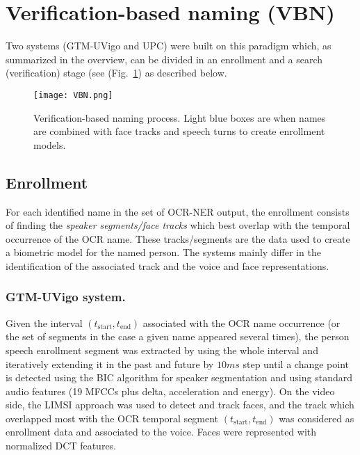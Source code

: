 \section{Verification-based naming (VBN)}
\label{sec:verification}

Two systems (GTM-UVigo and UPC) were built on this paradigm which, 
as summarized in the overview, can be divided in an enrollment and a 
search (verification) stage (see (Fig.~\ref{fig:vbn}) 
as described below.

\begin{figure}[tb]
 \centering
 \texttt{[image: VBN.png]}
\vspace*{-7mm}
 \caption{Verification-based naming process. Light blue boxes are when names are combined with face tracks and speech turns to create enrollment models.}
\vspace*{-3mm}
 \label{fig:vbn}
\end{figure}

\subsection{Enrollment}


For each identified name in the set of OCR-NER output, the enrollment consists of finding the  \textit{speaker segments/face tracks} 
which best overlap with the temporal occurrence of the OCR name. 
These tracks/segments are the data used to create a biometric model for the named person. 
%
The systems mainly differ in the identification of the associated track and the voice and face  representations.


\subsubsection{GTM-UVigo system.}
%
Given the interval  $(t_{\mathrm{start}},t_{\mathrm{end}})$ associated with the OCR name occurrence (or the set 
of segments in the case a given name appeared several times), the person speech enrollment segment was extracted by 
using the whole interval and iteratively  extending it in the past and future  by $10ms$ step until a change point 
is detected using the BIC algorithm for speaker segmentation and using standard audio features (19 MFCCs plus delta, acceleration and energy).
%
On the video side, the LIMSI approach was used to detect and track faces, and the track which overlapped most with the OCR temporal 
segment  $(t_{\mathrm{start}},t_{\mathrm{end}})$ was considered as enrollment data and associated to the voice.
Faces were represented with normalized DCT features.

